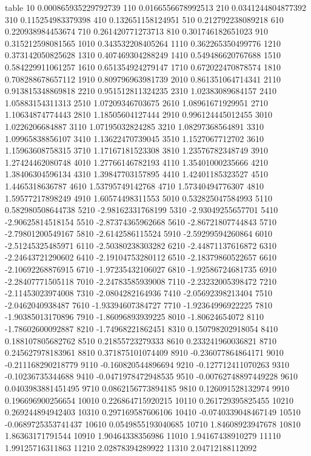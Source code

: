 table {%
10 0.000865935229792739
110 0.0166556678992513
210 0.0341244804877392
310 0.115254983379398
410 0.132651158124951
510 0.212792238089218
610 0.220938984453674
710 0.261420771273713
810 0.301746182651023
910 0.315212598081565
1010 0.343532208405264
1110 0.362265350499776
1210 0.373142050825628
1310 0.407469304288249
1410 0.549486620767688
1510 0.584229911061257
1610 0.651354924279147
1710 0.672022470878574
1810 0.708288678657112
1910 0.809796963981739
2010 0.861351064714341
2110 0.913815348869818
2210 0.951512811324235
2310 1.02383089684157
2410 1.05883154311313
2510 1.07209346703675
2610 1.08961671929951
2710 1.10634874774443
2810 1.18505604127444
2910 0.996124445012455
3010 1.0226206684887
3110 1.07195032824285
3210 1.08297368564891
3310 1.09965838856107
3410 1.13622470739045
3510 1.1527067712702
3610 1.15963608758315
3710 1.17167181523308
3810 1.23576782348749
3910 1.27424462080748
4010 1.27766146782193
4110 1.35401000235666
4210 1.38406304596134
4310 1.39847703157895
4410 1.42401185323527
4510 1.4465318636787
4610 1.53795749142768
4710 1.57340494776307
4810 1.59577217898249
4910 1.60574498311553
5010 0.532825047584993
5110 0.582980508644738
5210 -2.98162331768199
5310 -2.93049255657701
5410 -2.90625814518154
5510 -2.87374365962668
5610 -2.86721807744843
5710 -2.79801200549167
5810 -2.6142586115524
5910 -2.59299594260864
6010 -2.51245325485971
6110 -2.50380238303282
6210 -2.44871137616872
6310 -2.24643721290602
6410 -2.19104753280112
6510 -2.18379860522657
6610 -2.10692268876915
6710 -1.97235432106027
6810 -1.92586724681735
6910 -2.28407771505118
7010 -2.24783585939008
7110 -2.23232005398472
7210 -2.11453023974008
7310 -2.0804282164936
7410 -2.05692398213404
7510 -2.0462040938487
7610 -1.93394607384727
7710 -1.92364996922225
7810 -1.90385013170896
7910 -1.86096893939225
8010 -1.80624654072
8110 -1.78602600092887
8210 -1.74968221862451
8310 0.150798202918054
8410 0.188107805682762
8510 0.21855723279333
8610 0.233241960036821
8710 0.245627978183961
8810 0.371875101074409
8910 -0.236077864864171
9010 -0.211168290218779
9110 -0.160820544896694
9210 -0.127712411070263
9310 -0.10236735344688
9410 -0.0471978472948535
9510 -0.00762748897449228
9610 0.0403983881451495
9710 0.0862156773894185
9810 0.126091528132974
9910 0.196696900256654
10010 0.226864715920215
10110 0.261729395825455
10210 0.269244894942403
10310 0.297169587606106
10410 -0.0740339048467149
10510 -0.0689725353741437
10610 0.0549855193040685
10710 1.84608923947678
10810 1.86363171791544
10910 1.90464338356986
11010 1.94167438910279
11110 1.99125716311863
11210 2.02878394289922
11310 2.04712188112092
}
